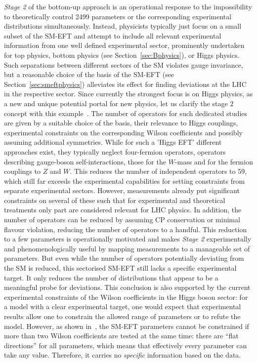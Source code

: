 \emph{Stage 2} of the bottom-up approach is an operational response
to the impossibility to theoretically control
2499 parameters or the corresponding experimental distributions
simultaneously. 
Instead, physicists typically just focus on a small subset of the SM-EFT and attempt to
include all relevant experimental information from one well defined
experimental sector, prominently undertaken for top physics, bottom
physics (see Section~\ref{sec:Bphysics}), or Higgs physics. 
Such separations between different sectors of the SM
violates gauge invariance, but a reasonable choice of the basis of the
SM-EFT (see Section~\ref{sec:smeftphysics}) alleviates its effect for  
finding deviations at the LHC in the respective sector.
Since currently the strongest focus is on Higgs physics, as a new
and unique potential portal for new physics, let us clarify the stage 2 concept with
this example~\citep{Espinosa:2016ovf,deFlorian:2016spz}.
The number of operators for such dedicated studies are given by a suitable choice
of the basis, their relevance to Higgs couplings,
experimental constraints on the corresponding Wilson coefficients and
possibly assuming additional symmetries.
While for such a 'Higgs EFT' different approaches exist, they typically neglect
four-fermion operators, operators
describing gauge-boson self-interactions, those for the $W$-mass and 
for the fermion couplings to $Z$ and $W$.
This reduces the number of independent operators to 59,
which still far exceeds the experimental capabilities for setting
constraints from separate experimental sectors. 
However, measurements already put significant constraints on several of these such that for experimental and theoretical treatments only part are considered relevant for LHC physics.
In addition, the number of operators can be reduced by assuming CP conservation or 
minimal flavour violation, reducing the number of operators to a handful.
This reduction to a few parameters is operationally motivated and makes \emph{Stage 2} experimentally and
phenomenologically useful by mapping measurements to a manageable set
of parameters. 
But even while the number of operators potentially
deviating from the SM is reduced, this sectorised SM-EFT still lacks a specific experimental target. 
It only reduces the number of distributions that appear to be a meaningful probe for deviations.
This conclusion is also
supported by the current experimental constraints of the Wilson
coefficients in the Higgs boson sector: for a model with a clear
experimental target, one would expect that experimental results allow one
to constrain the allowed range of parameters or to refute the
model. 
However, as shown in~\citep{ATL-PHYS-PUB-2019-042},
the SM-EFT parameters cannot be constrained if more than two Wilson
coefficients are tested at the same time: there are ``flat
directions'' for all parameters, which means that effectively every
parameter can take any value. Therefore, it carries no
\emph{specific} information based on the data.

